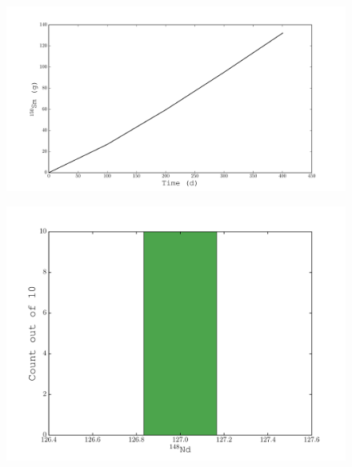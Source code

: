 \documentclass{beamer}
\begin{document}
\begin{frame}
    \begin{figure}[H]
    \begin{center}
      \includegraphics[width=0.77\columnwidth]{../Origen2/PLOTS/SM150Post_XY.pdf}
      \vspace{-5mm}
      \label{fig:POSTXYSm150}
    \end{center}
  \end{figure}
\end{frame}
    
\begin{frame}
  \begin{figure}[H]
    \begin{center}
      \includegraphics[width=0.77\columnwidth]{../Origen2/PLOTS/ND148Post_HIST.pdf}
      \vspace{-5mm}
      \label{fig:POSTHISTNd148}
    \end{center}
  \end{figure}
\end{frame}
  
\end{document}
